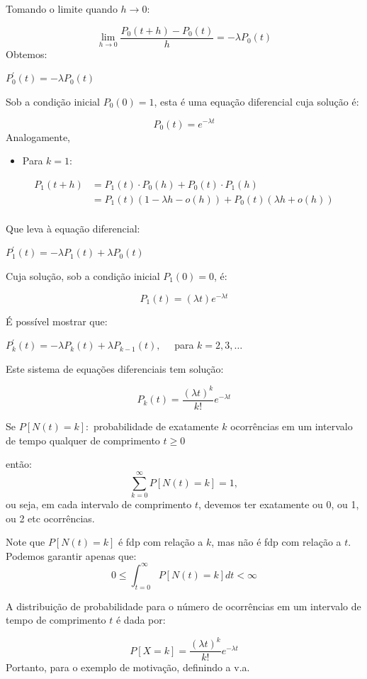 \documentclass[
]{book}
\providecommand{\tightlist}{%
  \setlength{\itemsep}{0pt}\setlength{\parskip}{0pt}}
\theoremstyle{definition}
\theoremstyle{definition}
\theoremstyle{definition}
\theoremstyle{remark}
\begin{document}
Tomando o limite quando \(h \rightarrow 0:\)

\[\lim_{h \rightarrow 0} \frac{P_0(t+h) - P_0(t)}{h} = - \lambda P_0(t)\]
Obtemos:

\(P_0^\prime(t) = - \lambda P_0(t)\)

Sob a condição inicial \(P_0(0) = 1\), esta é uma equação diferencial cuja solução é:

\[P_0(t) = e^{-\lambda t}\]
Analogamente,

\begin{itemize}
\tightlist
\item
  Para \(k = 1\):
\end{itemize}

\begin{align*}
  P_1(t+h) &= P_1(t)\cdot P_0(h) + P_0(t)\cdot P_1(h)\\ 
           &= P_1(t)(1 - \lambda h - o(h)) + P_0(t)(\lambda h + o(h))\\   
\end{align*}

Que leva à equação diferencial:

\(P_1^\prime(t) = - \lambda P_1(t) + \lambda P_0(t)\)

Cuja solução, sob a condição inicial \(P_1(0) = 0\), é:

\[P_1(t) = (\lambda t) e^{-\lambda t}\]

É possível mostrar que:

\(P_k^\prime(t) = - \lambda P_k(t) + \lambda P_{k-1}(t), \quad\) para \(k = 2, 3, \ldots\)

Este sistema de equações diferenciais tem solução:

\[P_k(t) = \frac{(\lambda t)^k}{k!} e^{-\lambda t}\]

Se
\(P[N(t)=k]:\) probabilidade de exatamente \(k\) ocorrências em um intervalo de tempo qualquer de comprimento \(t\geq 0\)

então:
\[\sum_{k=0}^\infty P[N(t)=k] = 1,\]
ou seja, em cada intervalo de comprimento \(t\), devemos ter exatamente ou 0, ou 1, ou 2 etc ocorrências.

Note que \(P[N(t)=k]\) é fdp com relação a \(k\), mas não é fdp com relação a \(t\). Podemos garantir apenas que:
\[0 \leq \int_{t=0}^\infty P[N(t)=k] dt < \infty\]

A distribuição de probabilidade para o número de ocorrências em um intervalo de tempo de comprimento \(t\) é dada por:

\[P[X = k] = \frac{(\lambda t)^k}{k!} e^{-\lambda t}\]
Portanto, para o exemplo de motivação, definindo a v.a.
\end{document}
